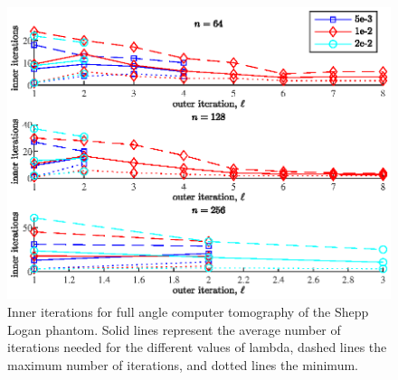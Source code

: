 \begin{figure}[htbp]
\begin{center}
\includegraphics{figures/shepp_logan_inner_its}
\caption{Inner iterations for full angle computer tomography of the Shepp Logan phantom.  Solid lines represent the average number of iterations needed for the different values of lambda, dashed lines the maximum number of iterations, and dotted lines the minimum.}
\label{fig:shepp_logan_inner_its}
\end{center}
\end{figure}%
